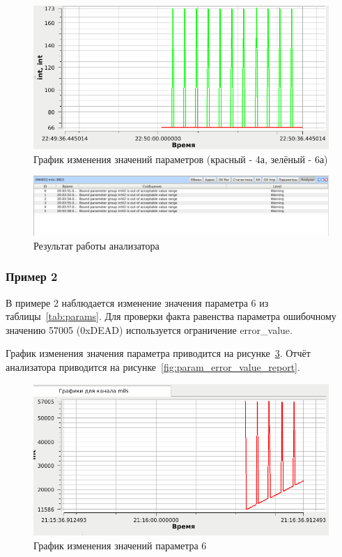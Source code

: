 \begin{figure}[H]
 \centering
 \includegraphics[scale=0.6]{tests/param_bind/graph}
 \caption{График изменения значений параметров (красный - 4а, зелёный - 6а)}
 \label{fig:param_bind_graph}
\end{figure}

\begin{figure}[H]
 \centering
 \includegraphics[scale=0.4]{tests/param_bind/report}
 \caption{Результат работы анализатора}
 \label{fig:param_bind_report}
\end{figure}

\subsubsection{Пример 2}

В примере 2 наблюдается изменение значения параметра 6 из 
таблицы~\ref{tab:params}. Для проверки факта равенства параметра ошибочному 
значению 57005 (0xDEAD) используется ограничение error\_value.

График изменения значения параметра 
приводится на рисунке~\ref{fig:param_error_value_graph}. Отчёт анализатора 
приводится на рисунке~\ref{fig:param_error_value_report}.



\begin{figure}[H]
 \centering
 \includegraphics[scale=0.6]{tests/param_error_value/graph}
 \caption{График изменения значений параметра 6}
 \label{fig:param_error_value_graph}
\end{figure}

